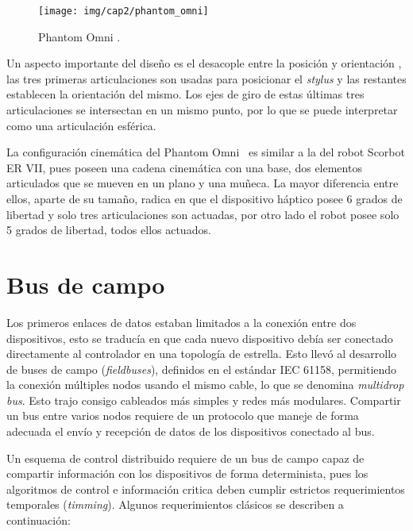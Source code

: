 \begin{figure}[ht]
  \centering
  \texttt{[image: img/cap2/phantom\_omni]}
  \caption{Phantom Omni \texttrademark.}
  \label{cap2_phantom}
\end{figure}

Un aspecto importante del diseño es el desacople entre la posición y orientación \cite{beckman2007}, las tres primeras articulaciones son usadas para posicionar el \textit{stylus} y las restantes establecen la orientación del mismo. Los ejes de giro de estas últimas tres articulaciones se intersectan en un mismo punto, por lo que se puede interpretar como una articulación esférica.

La configuración cinemática del Phantom Omni \texttrademark \, es similar a la del robot Scorbot ER VII, pues poseen una cadena cinemática con una base, dos elementos articulados que se mueven en un plano y una muñeca. La mayor diferencia entre ellos, aparte de su tamaño, radica en que el dispositivo háptico posee 6 grados de libertad y solo tres articulaciones son actuadas, por otro lado el robot posee solo 5 grados de libertad, todos ellos actuados. 

\section{Bus de campo}

Los primeros enlaces de datos estaban limitados a la conexión entre dos dispositivos, esto se traducía en que cada nuevo dispositivo debía ser conectado directamente al controlador en una topología de estrella. Esto llevó al desarrollo de buses de campo (\textit{fieldbuses}), definidos en el estándar IEC 61158, permitiendo la conexión múltiples nodos usando el mismo cable, lo que se denomina \textit{multidrop bus}. Esto trajo consigo cableados más simples y redes más modulares. Compartir un bus entre varios nodos requiere de un protocolo que maneje de forma adecuada el envío y recepción de datos de los dispositivos conectado al bus.

Un esquema de control distribuido requiere de un bus de campo capaz de compartir información con los dispositivos de forma determinista, pues los algoritmos de control e información critica deben cumplir estrictos requerimientos temporales (\textit{timming}). Algunos requerimientos clásicos se describen a continuación:

